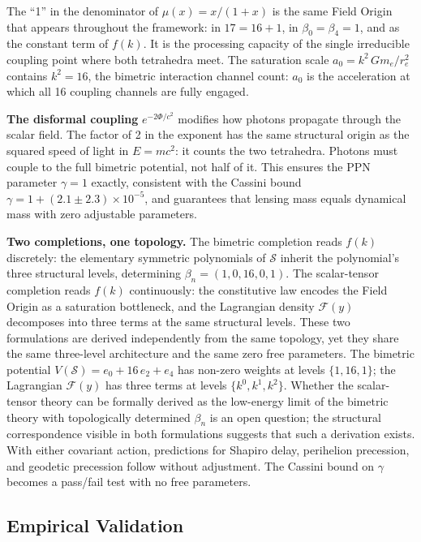 \documentclass[aps,prd,preprint,superscriptaddress,showpacs,preprintnumbers,amsmath,amssymb,nofootinbib]{revtex4-2}
\begin{document}
The ``1'' in the denominator of $\mu(x) = x/(1+x)$ is the same Field Origin that appears throughout the framework: in $17 = 16 + 1$, in $\beta_0 = \beta_4 = 1$, and as the constant term of $f(k)$. It is the processing capacity of the single irreducible coupling point where both tetrahedra meet. The saturation scale $a_0 = k^2\,Gm_e/r_e^2$ contains $k^2 = 16$, the bimetric interaction channel count: $a_0$ is the acceleration at which all 16 coupling channels are fully engaged.

\textbf{The disformal coupling} $e^{-2\Phi/c^2}$ modifies how photons propagate through the scalar field. The factor of 2 in the exponent has the same structural origin as the squared speed of light in $E = mc^2$: it counts the two tetrahedra. Photons must couple to the full bimetric potential, not half of it. This ensures the PPN parameter $\gamma = 1$ exactly, consistent with the Cassini bound $\gamma = 1 + (2.1 \pm 2.3) \times 10^{-5}$, and guarantees that lensing mass equals dynamical mass with zero adjustable parameters.

\textbf{Two completions, one topology.} The bimetric completion reads $f(k)$ discretely: the elementary symmetric polynomials of $\mathcal{S}$ inherit the polynomial's three structural levels, determining $\beta_n = (1, 0, 16, 0, 1)$. The scalar-tensor completion reads $f(k)$ continuously: the constitutive law encodes the Field Origin as a saturation bottleneck, and the Lagrangian density $\mathcal{F}(y)$ decomposes into three terms at the same structural levels. These two formulations are derived independently from the same topology, yet they share the same three-level architecture and the same zero free parameters. The bimetric potential $V(\mathcal{S}) = e_0 + 16\,e_2 + e_4$ has non-zero weights at levels $\{1, 16, 1\}$; the Lagrangian $\mathcal{F}(y)$ has three terms at levels $\{k^0, k^1, k^2\}$. Whether the scalar-tensor theory can be formally derived as the low-energy limit of the bimetric theory with topologically determined $\beta_n$ is an open question; the structural correspondence visible in both formulations suggests that such a derivation exists. With either covariant action, predictions for Shapiro delay, perihelion precession, and geodetic precession follow without adjustment. The Cassini bound on $\gamma$ becomes a pass/fail test with no free parameters.

\subsection{Empirical Validation}
\label{subsec:empirical_validation}
\end{document}

